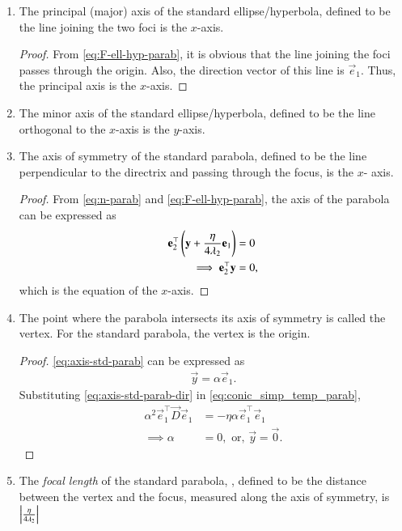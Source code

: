 \begin{enumerate}[label=\thesubsection.\arabic*.,ref=\thesubsection.\theenumi]
	\item
		\label{corr:axis}
			The principal (major) axis of the standard ellipse/hyperbola, defined to be the line joining the two foci   is the $x$-axis.  
	
	\begin{proof}
		From 	\eqref{eq:F-ell-hyp-parab}, it is obvious that the line joining the foci passes through the origin.  Also, the direction vector of this line is $\vec{e}_1$.  Thus, the principal axis is the $x$-axis. 
	\end{proof}
	\item
		\label{corr:minor-axis}
			The minor axis of the standard ellipse/hyperbola, defined to be the line orthogonal to the $x$-axis is the $y$-axis. 
	


	\item
			The axis of symmetry of the standard parabola, defined to be the line perpendicular to the directrix and passing through the focus,  is the $x$- axis.
	
	\begin{proof}
	From \eqref{eq:n-parab} and 	
					\eqref{eq:F-ell-hyp-parab}, 
					the axis of the parabola  can be expressed 
     as 
		\begin{align}
			\mathbf{e}_2^{\top}\left(\mathbf{y}  
			+\frac{\eta}{4\lambda_2}\mathbf{e}_1\right) &= 0
			\\
			\implies \mathbf{e}_2^{\top}\mathbf{y} &= 0
					\label{eq:axis-std-parab}, 
		\end{align}
		which is the equation of the $x$-axis.
	\end{proof}


	\item
			\label{corr:center-parab}
 The point where the parabola intersects its axis of symmetry is called the vertex. For the standard parabola, the vertex is the origin.
	
	\begin{proof}
					\eqref{eq:axis-std-parab} can be expressed as 
    \begin{align}
			\vec{y}= \alpha \vec{e}_1. 
					\label{eq:axis-std-parab-dir} 
    \end{align}
					Substituting \eqref{eq:axis-std-parab-dir} in 
    \eqref{eq:conic_simp_temp_parab}, 
    \begin{align}
	     \alpha^2 \vec{e}_1^{\top}\vec{D} \vec{e}_1 &=  -\eta\alpha \vec{e}_1^{\top} \vec{e}_1   
	     \\
	     \implies \alpha &=0, \text{ or, } \vec{y} = \vec{0}.
    \end{align}
	\end{proof}
	\item
			\label{corr:foclen}
	 The {\em focal length} of the standard parabola, , defined to be the distance between the vertex and the focus, measured along the axis of symmetry, is $\left\vert\frac{\eta}{4 \lambda_2}\right\vert$
	
\end{enumerate}
